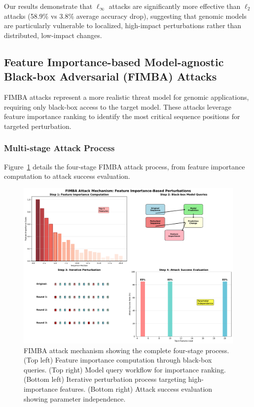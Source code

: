 \documentclass{article} %
\begin{document}
Our results demonstrate that $\ell_\infty$ attacks are significantly more effective than $\ell_2$ attacks (58.9\% vs 3.8\% average accuracy drop), suggesting that genomic models are particularly vulnerable to localized, high-impact perturbations rather than distributed, low-impact changes.

\subsection{Feature Importance-based Model-agnostic Black-box Adversarial (FIMBA) Attacks}

FIMBA attacks represent a more realistic threat model for genomic applications, requiring only black-box access to the target model. These attacks leverage feature importance ranking to identify the most critical sequence positions for targeted perturbation.

\subsubsection{Multi-stage Attack Process}

Figure~\ref{fig:fimba_mechanism} details the four-stage FIMBA attack process, from feature importance computation to attack success evaluation.

\begin{figure}[h]
\centering
\includegraphics[width=\textwidth]{figures/fimba_mechanism_diagram.pdf}
\caption{FIMBA attack mechanism showing the complete four-stage process. (Top left) Feature importance computation through black-box queries. (Top right) Model query workflow for importance ranking. (Bottom left) Iterative perturbation process targeting high-importance features. (Bottom right) Attack success evaluation showing parameter independence.}
\label{fig:fimba_mechanism}
\end{figure}
\end{document}
